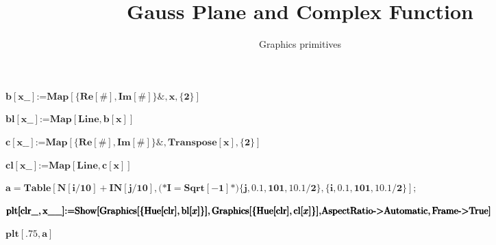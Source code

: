 \documentclass{article}
\begin{document}
\title{Gauss { }Plane { }and { }Complex { }Function}
\author{Graphics { }primitives}
\date{}
\maketitle

\begin{doublespace}
\noindent\(\pmb{b[\text{x$\_\_$}]\text{:=}\text{Map}[\{\text{Re}[\#],\text{Im}[\#]\}\&,x,\{2\}]}\)
\end{doublespace}

\begin{doublespace}
\noindent\(\pmb{\text{bl}[\text{x$\_\_$}]\text{:=}\text{Map}[\text{Line},b[x]]}\)
\end{doublespace}

\begin{doublespace}
\noindent\(\pmb{c[\text{x$\_\_$}]\text{:=}\text{Map}[\{\text{Re}[\#],\text{Im}[\#]\}\&,\text{Transpose}[x],\{2\}]}\)
\end{doublespace}

\begin{doublespace}
\noindent\(\pmb{\text{cl}[\text{x$\_\_$}]\text{:=}\text{Map}[\text{Line},c[x]]}\)
\end{doublespace}

\begin{doublespace}
\noindent\(\pmb{a=\text{Table}[N[i/10]+I N[j/10],\text{(*}I=\text{Sqrt}[-1]\text{*)}\{j,0.1,101,10.1/2\},\{i,0.1,101,10.1/2\}];}\)
\end{doublespace}

\begin{doublespace}
\noindent\(\pmb{\text{plt}[\text{clr$\_$},\text{x$\_\_$}]\text{:=}\text{Show}[\text{Graphics}[\{\text{Hue}[\text{clr}],\text{bl}[x]\}],\text{Graphics}[\{\text{Hue}[\text{clr}],\text{cl}[x]\}],}\\
\pmb{\text{AspectRatio}\text{-$>$}\text{Automatic},\text{Frame}\text{-$>$}\text{True}]}\)
\end{doublespace}

\begin{doublespace}
\noindent\(\pmb{\text{plt}[.75,a]}\)
\end{doublespace}
\end{document}
